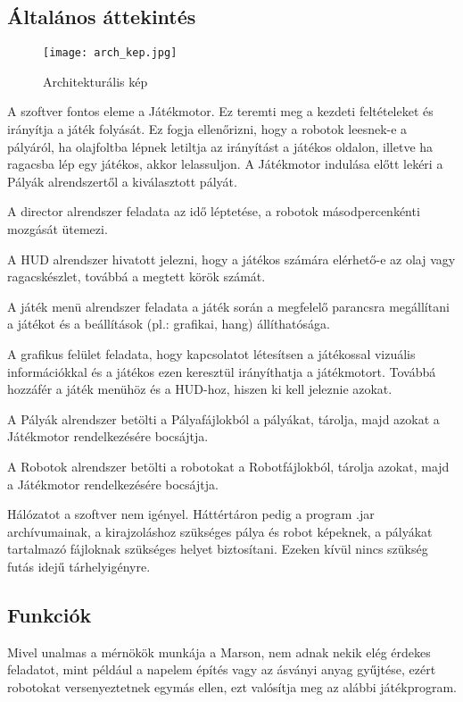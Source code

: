 \subsection{Általános áttekintés}


\begin{figure}
\centering
\texttt{[image: arch\_kep.jpg]}
\caption{Architekturális kép}
\label{fig:my_label}
\end{figure}

A szoftver fontos eleme a Játékmotor. Ez teremti meg a kezdeti feltételeket és irányítja a játék folyását. Ez fogja ellenőrizni, hogy a robotok leesnek-e a pályáról, ha olajfoltba lépnek letiltja az irányítást a játékos oldalon, illetve ha ragacsba lép egy játékos, akkor lelassuljon. A Játékmotor indulása előtt lekéri a Pályák alrendszertől a kiválasztott pályát.

A director alrendszer feladata az idő léptetése, a robotok másodpercenkénti mozgását ütemezi.

A HUD alrendszer hivatott jelezni, hogy a játékos számára elérhető-e az olaj vagy ragacskészlet, továbbá a megtett körök számát.

A játék menü alrendszer feladata a játék során a megfelelő parancsra megállítani a játékot és a beállítások (pl.: grafikai, hang) állíthatósága.

A grafikus felület feladata, hogy kapcsolatot létesítsen a játékossal vizuális információkkal és a játékos ezen keresztül irányíthatja a játékmotort. Továbbá hozzáfér a játék menühöz és a HUD-hoz, hiszen ki kell jeleznie azokat.

A Pályák alrendszer betölti a Pályafájlokból a pályákat, tárolja, majd azokat a Játékmotor rendelkezésére bocsájtja.

A Robotok alrendszer betölti a robotokat a Robotfájlokból, tárolja azokat, majd a Játékmotor rendelkezésére bocsájtja.

Hálózatot a szoftver nem igényel. Háttértáron pedig a program .jar archívumainak, a kirajzoláshoz szükséges pálya és robot képeknek, a pályákat tartalmazó fájloknak szükséges helyet biztosítani. Ezeken kívül nincs szükség futás idejű tárhelyigényre. 

\pagebreak
\subsection{Funkciók}Mivel unalmas a mérnökök munkája a Marson, nem adnak nekik elég érdekes feladatot, mint például a napelem építés vagy az ásványi anyag gyűjtése, ezért robotokat versenyeztetnek egymás ellen, ezt valósítja meg az alábbi játékprogram.


